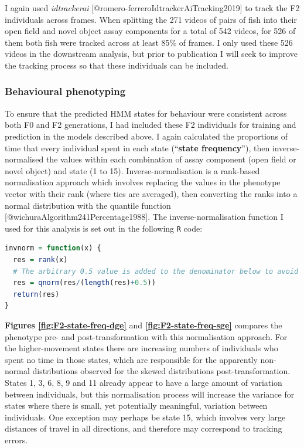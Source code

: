 \documentclass[
]{article}
\newcommand{\passthrough}[1]{#1}
\begin{document}
I again used \emph{idtrackerai} {[}@romero-ferreroIdtrackerAiTracking2019{]} to track the F2 individuals across frames. When splitting the 271 videos of pairs of fish into their open field and novel object assay components for a total of 542 videos, for 526 of them both fish were tracked across at least 85\% of frames. I only used these 526 videos in the downstream analysis, but prior to publication I will seek to improve the tracking process so that these individuals can be included.

\hypertarget{behavioural-phenotyping}{%
\subsubsection{Behavioural phenotyping}\label{behavioural-phenotyping}}

To ensure that the predicted HMM states for behaviour were consistent across both F0 and F2 generations, I had included these F2 individuals for training and prediction in the models described above. I again calculated the proportions of time that every individual spent in each state (``\textbf{state frequency}''), then inverse-normalised the values within each combination of assay component (open field or novel object) and state (1 to 15). Inverse-normalisation is a rank-based normalisation approach which involves replacing the values in the phenotype vector with their rank (where ties are averaged), then converting the ranks into a normal distribution with the quantile function {[}@wichuraAlgorithm241Percentage1988{]}. The inverse-normalisation function I used for this analysis is set out in the following \passthrough{\lstinline!R!} code:

\begin{lstlisting}[language=R]
invnorm = function(x) {
  res = rank(x)
  # The arbitrary 0.5 value is added to the denominator below to avoid `qnorm()` returning 'Inf' for the last-ranked value
  res = qnorm(res/(length(res)+0.5))
  return(res)
}
\end{lstlisting}

\textbf{Figures \ref{fig:F2-state-freq-dge}} and \textbf{\ref{fig:F2-state-freq-sge}} compares the phenotype pre- and post-transformation with this normalisation approach. For the higher-movement states there are increasing numbers of individuals who spent no time in those states, which are responsible for the apparently non-normal distributions observed for the skewed distributions post-transformation. States 1, 3, 6, 8, 9 and 11 already appear to have a large amount of variation between individuals, but this normalisation process will increase the variance for states where there is small, yet potentially meaningful, variation between individuals. One exception may perhaps be state 15, which involves very large distances of travel in all directions, and therefore may correspond to tracking errors.
\end{document}
